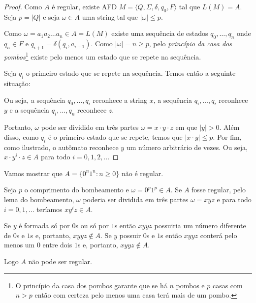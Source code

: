 \begin{proof}
Como $A$ é regular, existe AFD $M = \langle Q, \Sigma, \delta, q_0, F \rangle$ tal que $L(M) = A$.
Seja $p = |Q|$ e seja $\omega \in A$ uma string tal que $|\omega| \leq p$.

Como $\omega = a_1 a_2 \dots a_n \in A = L(M)$ existe uma sequência de estados $q_0, \dots, q_n$ onde $q_n \in F$ e $q_{i+1} = \delta(q_i, a_{i+1})$.
Como $|\omega| = n \geq p$, pelo {\em princípio da casa dos pombos}\footnote{O princípio da casa dos pombos garante que se há $n$ pombos e $p$ casas com $n > p$ então com certeza pelo menos uma casa terá mais de um pombo.} existe pelo menos um estado que se repete na sequência.

Seja $q_i$ o primeiro estado que se repete na sequência.
Temos então a seguinte situação:

\begin{center}
\end{center}

Ou seja, a sequência $q_0, \dots, q_i$ reconhece a string $x$, a sequência $q_i, \dots, q_i$ reconhece $y$ e a sequência $q_i, \dots, q_n$ reconhece $z$.

Portanto, $\omega$ pode ser dividido em três partes $\omega = x \cdot y \cdot z$ em que $|y| > 0$.
Além disso, como $q_i$ é o primeiro estado que se repete, temos que $|x \cdot y| \leq p$.
Por fim, como ilustrado, o autômato reconhece $y$ um número arbitrário de vezes.
Ou seja, $x \cdot y^i \cdot z \in A$ para todo $i = 0, 1, 2, \dots$
\end{proof}



\begin{example}
  Vamos mostrar que $A = \{0^n 1^n: n \geq 0\}$ não é regular.

  Seja $p$ o comprimento do bombeamento e $\omega = 0^p 1^p \in A$.
  Se $A$ fosse regular, pelo lema do bombeamento, $\omega$ poderia ser dividida em três partes $\omega = x  y  z$ e para todo $i = 0, 1, \dots$ teríamos $x  y^i  z \in A$.

Se $y$ é formada só por $0$s ou só por $1$s então $x  y  y  z$ possuiria um número diferente de $0$s e $1$s e, portanto, $x  y  y  z \notin A$.
Se $y$ possuir $0$s e $1$s então $x  y  y  z$ conterá pelo menos um $0$ entre dois $1$s e, portanto, $x  y  y  z \notin A$.

Logo $A$ não pode ser regular.
\end{example}

